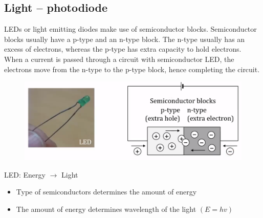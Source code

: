\documentclass[class=report, crop=false, 12pt,a4paper]{standalone}
\begin{document}
\subsection{Light – photodiode}
LEDs or light emitting diodes make use of semiconductor blocks. Semiconductor blocks usually have a p-type and an n-type block. The n-type usually has an excess of electrons, whereas the p-type has extra capacity to hold electrons. When a current is passed through a circuit with semiconductor LED, the electrons move from the n-type to the p-type block, hence completing the circuit. 
\begin{figure}[H]
  \centering
  \includegraphics[width = 0.8 \textwidth]{../img/Mdiagram53.png}
\end{figure}
LED: Energy $\rightarrow$ Light
\begin{itemize}
  \item Type of semiconductors determines the amount of energy
  \item The amount of energy determines wavelength of the light $(E = hv)$
\end{itemize}
\end{document}
